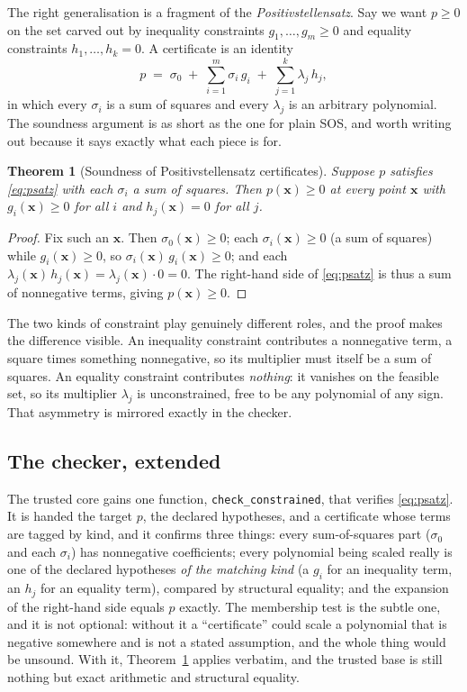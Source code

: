 \documentclass[11pt]{article}
\theoremstyle{definition}
\theoremstyle{plain}
\newtheorem{theorem}[definition]{Theorem}
\newcommand{\x}{\mathbf{x}}
\begin{document}
The right generalisation is a fragment of the \emph{Positivstellensatz}. Say we
want $p \ge 0$ on the set carved out by inequality constraints
$g_1,\dots,g_m \ge 0$ and equality constraints $h_1,\dots,h_k = 0$. A certificate
is an identity
\begin{equation}\label{eq:psatz}
  p \;=\; \sigma_0
    \;+\; \sum_{i=1}^{m} \sigma_i\, g_i
    \;+\; \sum_{j=1}^{k} \lambda_j\, h_j ,
\end{equation}
in which every $\sigma_i$ is a sum of squares and every $\lambda_j$ is an
arbitrary polynomial. The soundness argument is as short as the one for plain
SOS, and worth writing out because it says exactly what each piece is for.

\begin{theorem}[Soundness of Positivstellensatz certificates]\label{thm:psatz}
Suppose $p$ satisfies \eqref{eq:psatz} with each $\sigma_i$ a sum of squares.
Then $p(\x) \ge 0$ at every point $\x$ with $g_i(\x) \ge 0$ for all $i$ and
$h_j(\x) = 0$ for all $j$.
\end{theorem}
\begin{proof}
Fix such an $\x$. Then $\sigma_0(\x) \ge 0$; each $\sigma_i(\x) \ge 0$ (a sum of
squares) while $g_i(\x) \ge 0$, so $\sigma_i(\x)\,g_i(\x) \ge 0$; and each
$\lambda_j(\x)\,h_j(\x) = \lambda_j(\x)\cdot 0 = 0$. The right-hand side of
\eqref{eq:psatz} is thus a sum of nonnegative terms, giving $p(\x) \ge 0$.
\end{proof}

The two kinds of constraint play genuinely different roles, and the proof makes
the difference visible. An inequality constraint contributes a nonnegative
term, a square times something nonnegative, so its multiplier must itself be a
sum of squares. An equality constraint contributes \emph{nothing}: it vanishes on
the feasible set, so its multiplier $\lambda_j$ is unconstrained, free to be any
polynomial of any sign. That asymmetry is mirrored exactly in the checker.

\subsection{The checker, extended}

The trusted core gains one function, \texttt{check\_constrained}, that verifies
\eqref{eq:psatz}. It is handed the target $p$, the declared hypotheses, and a
certificate whose terms are tagged by kind, and it confirms three things: every
sum-of-squares part ($\sigma_0$ and each $\sigma_i$) has nonnegative
coefficients; every polynomial being scaled really is one of the declared
hypotheses \emph{of the matching kind} (a $g_i$ for an inequality term, an $h_j$
for an equality term), compared by structural equality; and the expansion of the
right-hand side equals $p$ exactly. The membership test is the subtle one, and it
is not optional: without it a ``certificate'' could scale a polynomial that is
negative somewhere and is not a stated assumption, and the whole thing would be
unsound. With it, Theorem~\ref{thm:psatz} applies verbatim, and the trusted base
is still nothing but exact arithmetic and structural equality.
\end{document}
